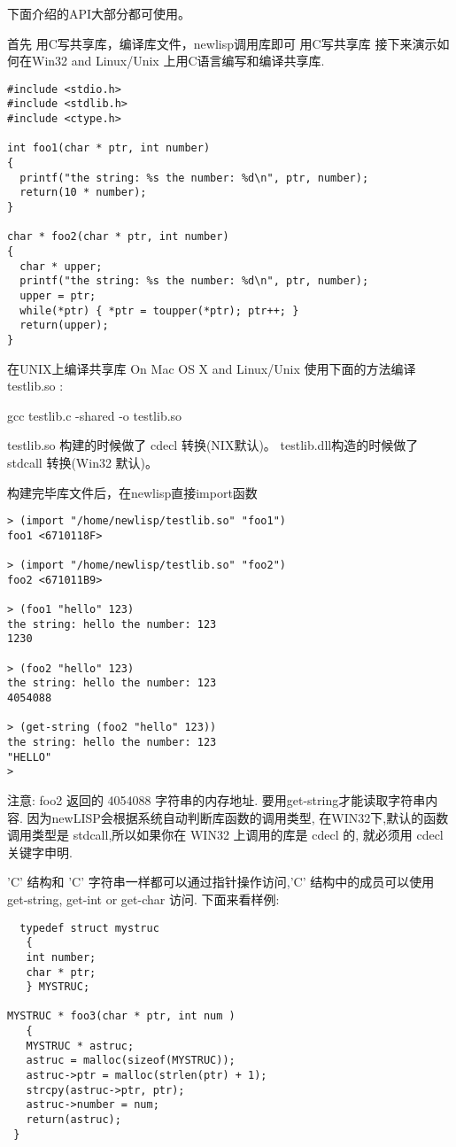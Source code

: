\documentclass[cn,11pt]{elegantbook}
\begin{document}
下面介绍的API大部分都可使用。

首先 用C写共享库，编译库文件，newlisp调用库即可
用C写共享库
接下来演示如何在Win32 and Linux/Unix 上用C语言编写和编译共享库.

\begin{lstlisting}
#include <stdio.h>
#include <stdlib.h>
#include <ctype.h>
 
int foo1(char * ptr, int number)
{
  printf("the string: %s the number: %d\n", ptr, number);
  return(10 * number);
}
 
char * foo2(char * ptr, int number)
{
  char * upper;
  printf("the string: %s the number: %d\n", ptr, number);
  upper = ptr;
  while(*ptr) { *ptr = toupper(*ptr); ptr++; }
  return(upper);
}
\end{lstlisting}

在UNIX上编译共享库
On Mac OS X and Linux/Unix 使用下面的方法编译 testlib.so :

gcc testlib.c -shared -o testlib.so

testlib.so 构建的时候做了 cdecl 转换(NIX默认)。
testlib.dll构造的时候做了 stdcall 转换(Win32 默认)。

构建完毕库文件后，在newlisp直接import函数
\begin{lstlisting}
> (import "/home/newlisp/testlib.so" "foo1")
foo1 <6710118F>
 
> (import "/home/newlisp/testlib.so" "foo2")
foo2 <671011B9>
 
> (foo1 "hello" 123)
the string: hello the number: 123
1230
 
> (foo2 "hello" 123)
the string: hello the number: 123
4054088
 
> (get-string (foo2 "hello" 123))
the string: hello the number: 123
"HELLO"
>
\end{lstlisting}
注意: foo2 返回的 4054088 字符串的内存地址. 要用get-string才能读取字符串内容. 因为newLISP会根据系统自动判断库函数的调用类型, 在WIN32下,默认的函数调用类型是 stdcall,所以如果你在 WIN32 上调用的库是 cdecl 的, 就必须用 cdecl 关键字申明.

'C' 结构和 'C' 字符串一样都可以通过指针操作访问,'C' 结构中的成员可以使用 get-string, get-int or get-char 访问. 下面来看样例:
\begin{lstlisting}
  typedef struct mystruc
   {
   int number;
   char * ptr;
   } MYSTRUC;
 
MYSTRUC * foo3(char * ptr, int num )
   {
   MYSTRUC * astruc;
   astruc = malloc(sizeof(MYSTRUC));
   astruc->ptr = malloc(strlen(ptr) + 1);
   strcpy(astruc->ptr, ptr);
   astruc->number = num;
   return(astruc);
 }
\end{lstlisting}
\end{document}
